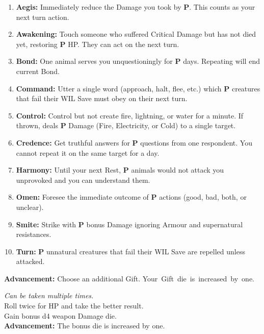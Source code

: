\documentclass[itdr]{subfiles}
\begin{document}
\begin{enumerate}
	\item \textbf{Aegis:} Immediately reduce the Damage you took by \textbf{P}. This counts as your next turn action.
	\item \textbf{Awakening:} Touch someone who suffered Critical Damage but has not died yet, restoring \textbf{P} HP. They can act on the next turn.
	\item \textbf{Bond:} One animal serves you unquestioningly for \textbf{P} days. Repeating will end current Bond.
	\item \textbf{Command:} Utter a single word (approach, halt, flee, etc.) which \textbf{P} creatures that fail their WIL Save must obey on their next turn.
	\item \textbf{Control:} Control but not create fire, lightning, or water for a minute. If thrown, deals \textbf{P} Damage (Fire, Electricity, or Cold) to a single target.
	\item \textbf{Credence:} Get truthful answers for \textbf{P} questions from one respondent. You cannot repeat it on the same target for a day.
	\item \textbf{Harmony:} Until your next Rest, \textbf{P} animals would not attack you unprovoked and you can understand them.
	\item \textbf{Omen:} Foresee the immediate outcome of \textbf{P} actions (good, bad, both, or unclear).
	\item \textbf{Smite:} Strike with \textbf{P} bonus Damage ignoring Armour and supernatural resistances.
	\item \textbf{Turn:} \textbf{P} unnatural creatures that fail their WIL Save are repelled unless attacked.
\end{enumerate}

\textbf{Advancement:} Choose an additional Gift. \mbox{Your Gift die is increased by one.}

\vfill
{} {\slshape Can be taken multiple times.}\\
Roll twice for HP and take the better result.\\
Gain bonus d4 weapon Damage die.\\
\textbf{Advancement:} The bonus die is increased by one.

\break

~\\
\vfill
\end{document}

